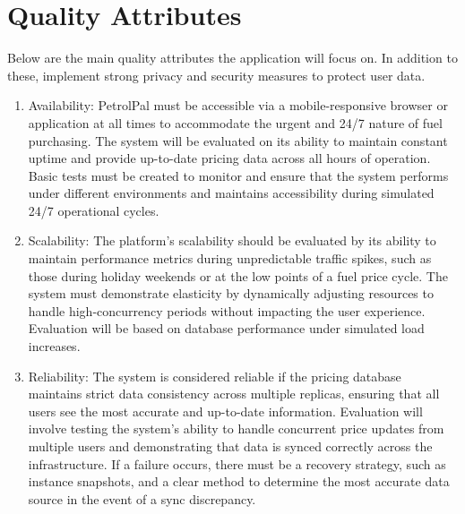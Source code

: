 \section*{Quality Attributes}
Below are the main quality attributes the application will focus on. 
In addition to these, implement strong privacy and security measures to protect user data.
\begin{enumerate}
\item Availability: PetrolPal must be accessible via a mobile-responsive browser or application at all times to accommodate the urgent and 24/7 nature of fuel purchasing. The system will be evaluated on its ability to maintain constant uptime and provide up-to-date pricing data across all hours of operation. Basic tests must be created to monitor and ensure that the system performs under different environments and maintains accessibility during simulated 24/7 operational cycles.
\item Scalability: The platform's scalability should be evaluated by its ability to maintain performance metrics during unpredictable traffic spikes, such as those during holiday weekends or at the low points of a fuel price cycle. The system must demonstrate elasticity by dynamically adjusting resources to handle high-concurrency periods without impacting the user experience. Evaluation will be based on database performance under simulated load increases.
\item Reliability: The system is considered reliable if the pricing database maintains strict data consistency across multiple replicas, ensuring that all users see the most accurate and up-to-date information. Evaluation will involve testing the system’s ability to handle concurrent price updates from multiple users and demonstrating that data is synced correctly across the infrastructure. If a failure occurs, there must be a recovery strategy, such as instance snapshots, and a clear method to determine the most accurate data source in the event of a sync discrepancy.
\end{enumerate}

